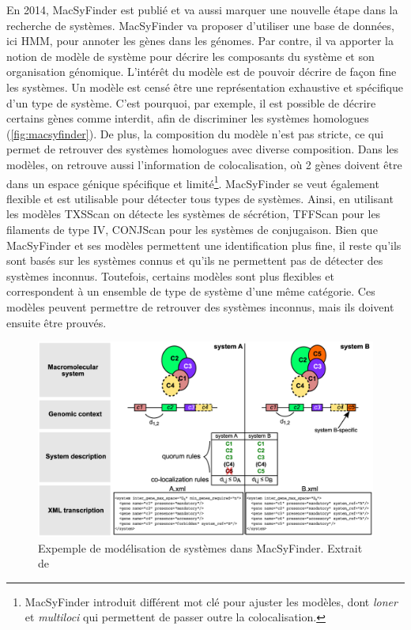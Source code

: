 En 2014, MacSyFinder  est publié \cite{abby_macsyfinder_2014} et va aussi marquer une nouvelle étape dans la recherche de systèmes. MacSyFinder va  proposer d'utiliser une base de données, ici HMM, pour annoter les gènes dans les génomes. Par contre, il va apporter la notion de modèle de système pour décrire les composants du système et son organisation génomique. L'intérêt du modèle est de pouvoir décrire de façon fine les systèmes. Un modèle est censé être une représentation exhaustive et spécifique d'un type de système. C'est pourquoi, par exemple, il est possible de décrire certains gènes comme interdit, afin de discriminer les systèmes homologues (\autoref{fig:macsyfinder}). De plus, la composition du modèle n'est pas stricte, ce qui permet de retrouver des systèmes homologues avec diverse composition. Dans les modèles, on retrouve aussi l'information de colocalisation, où 2 gènes doivent être dans un espace génique spécifique et limité\footnote{MacSyFinder introduit différent mot clé pour ajuster les modèles, dont \textit{loner} et \textit{multi\textunderscore loci} qui permettent de passer outre la colocalisation.}. MacSyFinder se veut également flexible et est utilisable pour détecter tous types de systèmes. Ainsi, en utilisant les modèles TXSScan \cite{abby_identification_2016} on détecte les systèmes de sécrétion, TFFScan \cite{denise_diversification_2019} pour les filaments de type IV, CONJScan \cite{cury_integrative_2017} pour les systèmes de conjugaison. Bien que MacSyFinder et ses modèles permettent une identification plus fine, il reste qu'ils sont basés sur les systèmes connus et qu'ils ne permettent pas de détecter des systèmes inconnus. Toutefois, certains modèles sont plus flexibles et correspondent à un ensemble de type de système d'une même catégorie. Ces modèles peuvent permettre de retrouver des systèmes inconnus, mais ils doivent ensuite être prouvés. 

\begin{figure}[htbp]
    \centering
    \includegraphics[width=0.75\linewidth]{images/macsyfinder.png}
    \caption{Expemple de modélisation de systèmes dans MacSyFinder. Extrait de \cite{abby_macsyfinder_2014}}
    \label{fig:macsyfinder}
\end{figure}

